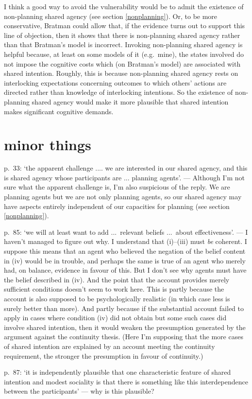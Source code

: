 \documentclass[12pt,letterpaper]{extarticle}
\begin{document}
I think a good way to avoid the vulnerability would be to admit the existence of non-planning shared agency (see section \vref{nonplanning}).
Or, to be  more conservative, Bratman could allow that, if the evidence turns out to support this line of objection, then it shows that there is non-planning shared agency rather than that Bratman's model is incorrect.
Invoking non-planning shared agency is helpful because, at least on some models of it (e.g.\ mine), the states involved do not impose the cognitive costs which (on Bratman's model) are associated with shared intention.
Roughly, this is because non-planning shared agency rests on interlocking expectations concerning outcomes to which others' actions are directed rather than knowledge of interlocking intentions.
So the existence of non-planning shared agency would make it more plausible that shared intention makes significant cognitive demands.





\section{minor things}

p.\ 33: `the apparent challenge .... we are interested in our shared agency, and this is shared agency whose participants are ... planning agents'. --- Although I'm not sure what the apparent challenge is, I'm also suspicious of the reply.  We are planning agents but we are not only planning agents, so our shared agency may have aspects entirely independent of our capacities for planning (see section \vref{nonplanning}).

p.\ 85: `we will at least want to add ...\ relevant beliefs  ...\ about effectiveness'. --- I haven't managed to figure out why.  I understand that (i)--(iii) must \emph{be} coherent.
I suppose this means that an agent who believed the negation of the belief content in (iv) would be in trouble, and perhaps the same is true of an agent who merely had, on balance, evidence in favour of this.
But I don't see why agents must have the belief described in (iv).
And the point that the account provides merely sufficient conditions doesn't seem to work here.
This is partly because the account is also supposed to be psychologically realistic (in which case less is surely better than more).
And partly because if the substantial account failed to  apply in cases where condition (iv) did not obtain but some such cases did involve shared intention, then it would weaken the presumption generated by the argument against the continuity thesis.
(Here I'm supposing that the more cases of shared intention are explained by an account meeting the continuity requirement, the stronger the presumption in favour of continuity.)

p.\ 87: `it is independently plausible that one characteristic feature of shared intention and modest sociality is that there is something like this interdependence between the participants' --- why is this plausible?  





\small

\end{document}
